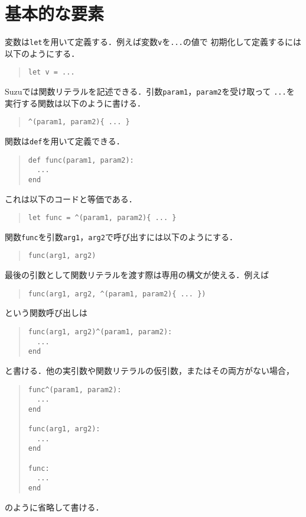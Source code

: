 \documentclass[a4paper,11pt,dvipdfmx]{jreport}
\begin{document}
\section{基本的な要素}

変数は\verb|let|を用いて定義する．例えば変数\verb|v|を\verb|...|の値で
初期化して定義するには以下のようにする．
\begin{quote}
\begin{verbatim}
let v = ...
\end{verbatim}
\end{quote}

Suzuでは関数リテラルを記述できる．引数\verb|param1|，\verb|param2|を受け取って
\verb|...|を実行する関数は以下のように書ける．
\begin{quote}
\begin{verbatim}
^(param1, param2){ ... }
\end{verbatim}
\end{quote}

関数は\verb|def|を用いて定義できる．
\begin{quote}
\begin{verbatim}
def func(param1, param2):
  ...
end
\end{verbatim}
\end{quote}
これは以下のコードと等価である．
\begin{quote}
\begin{verbatim}
let func = ^(param1, param2){ ... }
\end{verbatim}
\end{quote}

関数\verb|func|を引数\verb|arg1|，\verb|arg2|で呼び出すには以下のようにする．
\begin{quote}
\begin{verbatim}
func(arg1, arg2)
\end{verbatim}
\end{quote}

最後の引数として関数リテラルを渡す際は専用の構文が使える．例えば
\begin{quote}
\begin{verbatim}
func(arg1, arg2, ^(param1, param2){ ... })
\end{verbatim}
\end{quote}
という関数呼び出しは
\begin{quote}
\begin{verbatim}
func(arg1, arg2)^(param1, param2):
  ...
end
\end{verbatim}
\end{quote}
と書ける．他の実引数や関数リテラルの仮引数，またはその両方がない場合，
\begin{quote}
\begin{verbatim}
func^(param1, param2):
  ...
end

func(arg1, arg2):
  ...
end

func:
  ...
end
\end{verbatim}
\end{quote}
のように省略して書ける．
\end{document}
